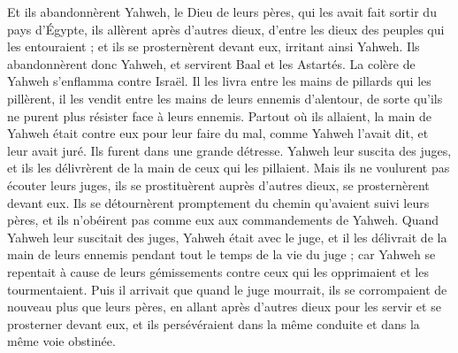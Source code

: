 \begin{multicols}{2}
Et ils abandonnèrent Yahweh, le Dieu de leurs pères, qui les avait fait sortir du pays d’Égypte, ils allèrent après d'autres dieux, d'entre les dieux des peuples qui les entouraient ; et ils se prosternèrent devant eux, irritant ainsi Yahweh.
Ils abandonnèrent donc Yahweh, et servirent Baal et les Astartés.
La colère de Yahweh s'enflamma contre Israël. Il les livra entre les mains de pillards qui les pillèrent, il les vendit entre les mains de leurs ennemis d'alentour, de sorte qu'ils ne purent plus résister face à leurs ennemis.
Partout où ils allaient, la main de Yahweh était contre eux pour leur faire du mal, comme Yahweh l’avait dit, et leur avait juré. Ils furent dans une grande détresse.
Yahweh leur suscita des juges, et ils les délivrèrent de la main de ceux qui les pillaient.
Mais ils ne voulurent pas écouter leurs juges, ils se prostituèrent auprès d'autres dieux, se prosternèrent devant eux. Ils se détournèrent promptement du chemin qu’avaient suivi leurs pères, et ils n’obéirent pas comme eux aux commandements de Yahweh.
Quand Yahweh leur suscitait des juges, Yahweh était avec le juge, et il les délivrait de la main de leurs ennemis pendant tout le temps de la vie du juge ; car Yahweh se repentait à cause de leurs gémissements contre ceux qui les opprimaient et les tourmentaient.
Puis il arrivait que quand le juge mourrait, ils se corrompaient de nouveau plus que leurs pères, en allant après d'autres dieux pour les servir et se prosterner devant eux, et ils persévéraient dans la même conduite et dans la même voie obstinée.

\end{multicols}
